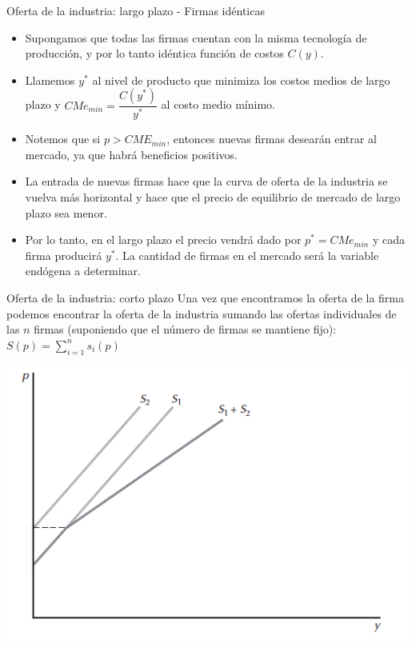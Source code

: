\documentclass{beamer}
\theoremstyle{definition}
\begin{document}
\begin{frame}{Oferta de la industria: largo plazo - Firmas idénticas}
\begin{itemize}
\item Supongamos que todas las firmas cuentan con la misma tecnología de producción, y por lo tanto idéntica función de costos $C(y)$.
\item Llamemos $y^{*}$ al nivel de producto que minimiza los costos medios de largo plazo y $CMe_{min} = \dfrac{C(y^{*})}{y^{*}}$ al costo medio mínimo.
\item Notemos que si $p > CME_{min}$, entonces nuevas firmas desearán entrar al mercado, ya que habrá beneficios positivos.
\item La entrada de nuevas firmas hace que la curva de oferta de la industria se vuelva más horizontal y hace que el precio de equilibrio de mercado de largo plazo sea menor. 
\item Por lo tanto, en el largo plazo el precio vendrá dado por $p^{*}= CMe_{min}$ y cada firma producirá $y^{*}$. La cantidad de firmas en el mercado será la variable endógena a determinar.
\end{itemize}
\end{frame}

\begin{frame}{Oferta de la industria: corto plazo}
 Una vez que encontramos la oferta de la firma podemos encontrar la oferta de la industria sumando las ofertas individuales de las $n$ firmas (suponiendo que el número de firmas se mantiene fijo): $S(p) = \sum_{i=1}^{n}s_{i}(p)$
    
    


    \begin{center}
\includegraphics[scale=0.5]{figures5/industry_offer.png}
\end{center}
\end{frame}
\end{document}
